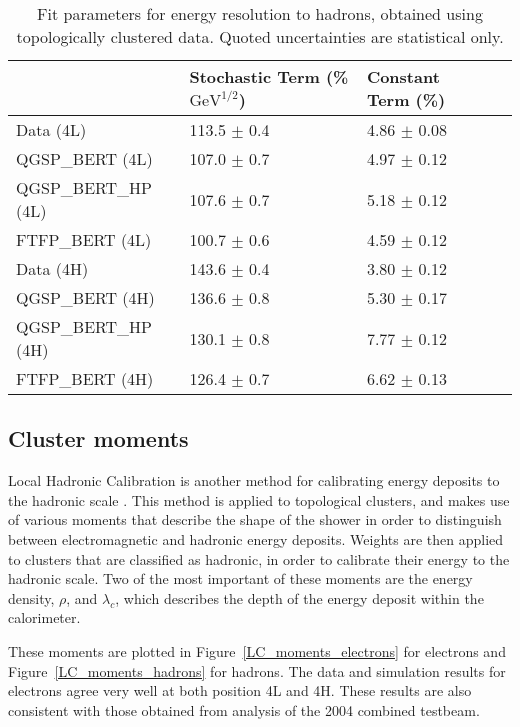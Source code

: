 \begin{table}[!htb]
\begin{center}
\begin{tabular}{|l|l|l|l|}
\hline
& Stochastic Term (\% $\mathrm{GeV}^{1/2}$) & Constant Term (\%) \\
\hline
Data (4L) & 113.5 $\pm$ 0.4 & 4.86 $\pm$ 0.08\\
QGSP\_BERT (4L) & 107.0 $\pm$ 0.7 & 4.97 $\pm$ 0.12\\
QGSP\_BERT\_HP (4L) & 107.6 $\pm$ 0.7 & 5.18 $\pm$ 0.12\\
FTFP\_BERT (4L) & 100.7 $\pm$ 0.6 & 4.59 $\pm$ 0.12\\
Data (4H) & 143.6 $\pm$ 0.4 & 3.80 $\pm$ 0.12\\
QGSP\_BERT (4H) & 136.6 $\pm$ 0.8 & 5.30 $\pm$ 0.17\\
QGSP\_BERT\_HP (4H) & 130.1 $\pm$ 0.8 & 7.77 $\pm$ 0.12\\
FTFP\_BERT (4H) & 126.4 $\pm$ 0.7 & 6.62 $\pm$ 0.13\\
\hline
\end{tabular}
\end{center}
\caption{Fit parameters for energy resolution to hadrons, obtained using topologically clustered data. Quoted uncertainties are statistical only.}
\label{table_resolution_hadrons_t420}
\end{table}
\subsection{Cluster moments}
Local Hadronic Calibration is another method for calibrating energy deposits to the hadronic scale \cite{localHadronicCalibration}. This method is applied to topological clusters, and makes use of various moments that describe the shape of the shower in order to distinguish between electromagnetic and hadronic energy deposits. Weights are then applied to clusters that are classified as hadronic, in order to calibrate their energy to the hadronic scale. Two of the most important of these moments are the energy density, $\rho$, and $\lambda_c$, which describes the depth of the energy deposit within the calorimeter. 

These moments are plotted in Figure~\ref{LC_moments_electrons} for electrons and Figure~\ref{LC_moments_hadrons} for hadrons. The data and simulation results for electrons agree very well at both position 4L and 4H. These results are also consistent with those obtained from analysis of the 2004 combined testbeam\cite{nim_tbp}. 

